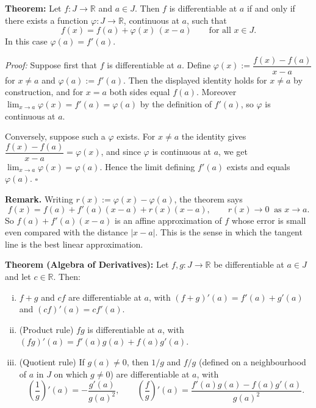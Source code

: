 \documentclass[a4paper,11pt,abstracton]{scrartcl}
\newcommand{\RR}{\mathbb{R}}
\theoremstyle{dotlessP}
\theoremstyle{dotlessS}
\theoremstyle{remark}
\theoremstyle{definition}
\begin{document}
\begin{problem_box}
\textbf{Theorem:}
Let $f:J\to\RR$ and $a\in J$. Then $f$ is differentiable at $a$ if and only if there exists a function $\varphi:J\to\RR$, continuous at $a$, such that
\[
    f(x)=f(a)+\varphi(x)\,(x-a)\qquad\text{for all }x\in J.
\]
In this case $\varphi(a)=f'(a)$.
\end{problem_box}

\begin{claim_box}
\textit{Proof:}
Suppose first that $f$ is differentiable at $a$. Define $\varphi(x):=\dfrac{f(x)-f(a)}{x-a}$ for $x\ne a$ and $\varphi(a):=f'(a)$. Then the displayed identity holds for $x\ne a$ by construction, and for $x=a$ both sides equal $f(a)$. Moreover $\lim_{x\to a}\varphi(x)=f'(a)=\varphi(a)$ by the definition of $f'(a)$, so $\varphi$ is continuous at $a$.

Conversely, suppose such a $\varphi$ exists. For $x\ne a$ the identity gives $\dfrac{f(x)-f(a)}{x-a}=\varphi(x)$, and since $\varphi$ is continuous at $a$, we get $\lim_{x\to a}\varphi(x)=\varphi(a)$. Hence the limit defining $f'(a)$ exists and equals $\varphi(a)$.
\hfill$\square$
\end{claim_box}

\begin{remark_box}
\textbf{Remark.} Writing $r(x):=\varphi(x)-\varphi(a)$, the theorem says
\[
    f(x)=f(a)+f'(a)(x-a)+r(x)(x-a),\qquad r(x)\to0\ \text{ as }x\to a.
\]
So $f(a)+f'(a)(x-a)$ is an affine approximation of $f$ whose error is small even compared with the distance $|x-a|$. This is the sense in which the tangent line is the best linear approximation.
\end{remark_box}

\begin{problem_box}
\textbf{Theorem (Algebra of Derivatives):}
Let $f,g:J\to\RR$ be differentiable at $a\in J$ and let $c\in\RR$. Then:
\begin{enumerate}[(i)]
    \item $f+g$ and $cf$ are differentiable at $a$, with $(f+g)'(a)=f'(a)+g'(a)$ and $(cf)'(a)=cf'(a)$.
    \item (Product rule) $fg$ is differentiable at $a$, with $(fg)'(a)=f'(a)g(a)+f(a)g'(a)$.
    \item (Quotient rule) If $g(a)\ne0$, then $1/g$ and $f/g$ (defined on a neighbourhood of $a$ in $J$ on which $g\ne0$) are differentiable at $a$, with
    \[
        \left(\frac1g\right)'(a)=-\frac{g'(a)}{g(a)^2},\qquad
        \left(\frac fg\right)'(a)=\frac{f'(a)g(a)-f(a)g'(a)}{g(a)^2}.
    \]
\end{enumerate}
\end{problem_box}
\end{document}
